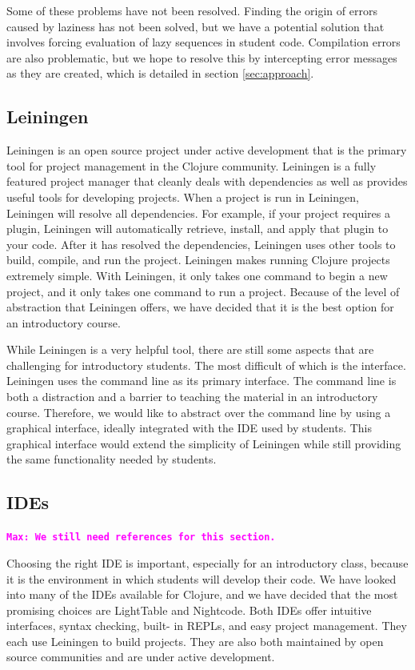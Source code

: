 \documentclass[12pt]{article}
\newcommand{\comment}[1]{{\bf \tt  {#1}}}
\newcommand{\mmcomment}[1]{\textcolor{magenta}{\comment{Max: {#1}}}}
\begin{document}
Some of these problems have not been resolved. Finding the origin of errors caused by 
laziness has not been solved, but we have a potential solution that involves forcing 
evaluation of lazy sequences in student code. Compilation errors are also problematic, 
but we hope to resolve this by intercepting error messages as they are created, which is 
detailed in section \ref{sec:approach}.


 
\subsection{Leiningen}
Leiningen is an open source project under active development that is the primary tool 
for project management in the Clojure community\cite{LeinGitHub}. Leiningen is a fully 
featured project manager that cleanly deals with dependencies as well as provides useful 
tools for developing projects. When a project is run in Leiningen, Leiningen will 
resolve all dependencies. For example, if your project requires a plugin, Leiningen will 
automatically retrieve, install, and apply that plugin to your code. After it has 
resolved the dependencies, Leiningen uses other tools to build, compile, and run the 
project. Leiningen makes running Clojure projects extremely simple. With Leiningen, it 
only takes one command to begin a new project, and it only takes one command to run a 
project. Because of the level of abstraction that Leiningen offers, we have decided that 
it is the best option for an introductory course.

While Leiningen is a very helpful tool, there are still some aspects that are 
challenging for introductory students. The most difficult of which is the interface. 
Leiningen uses the command line as its primary interface. The command line is both a 
distraction and a barrier to teaching the material in an introductory course. Therefore, 
we would like to abstract over the command line by using a graphical interface, ideally 
integrated with the IDE used by students. This graphical interface would extend the 
simplicity of Leiningen while still providing the same functionality needed by students.

\subsection{IDEs}
\mmcomment{We still need references for this section.}

Choosing the right IDE is important, especially for an introductory class, because it is 
the environment in which students will develop their code. We have looked into many of 
the IDEs available for Clojure, and we have decided that the most promising choices are 
LightTable and Nightcode. Both IDEs offer intuitive interfaces, syntax checking, built-
in REPLs, and easy project management. They each use Leiningen to build projects. They 
are also both maintained by open source communities and are under active development.  
\end{document}
